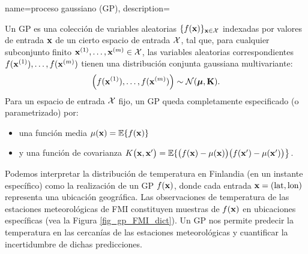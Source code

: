 {name={proceso gaussiano (GP)},
  description={Un GP es una colección de variables aleatorias
  	$\{f({\bf x})\}_{{\bf x} \in \mathcal{X}}$ indexadas por valores de entrada ${\bf x}$ 
  	de un cierto espacio de entrada $\mathcal{X}$, tal que, para cualquier subconjunto finito 
  	${\bf x}^{(1)}, \ldots, {\bf x}^{(m)} \in \mathcal{X}$, 
  	las variables aleatorias correspondientes $f({\bf x}^{(1)}), \ldots, f({\bf x}^{(m)})$ 
  	tienen una distribución conjunta gaussiana multivariante:
  	\[
  	\left( f({\bf x}^{(1)}), \ldots, f({\bf x}^{(m)}) \right) \sim \mathcal{N}(\boldsymbol{\mu}, \mathbf{K}).
  	\]
  	Para un espacio de entrada $\mathcal{X}$ fijo, un GP queda completamente especificado (o parametrizado) por:
  	\begin{itemize}
  		\item una función media $\mu({\bf x}) = \mathbb{E}\{ f({\bf x})\}$
  		\item y una función de covarianza $K\big({\bf x},{\bf x}'\big) = \mathbb{E}\{ \big(f({\bf x})-\mu({\bf x})\big) \big(f({\bf x}')-\mu({\bf x}')\big) \big\}$.
  	\end{itemize}
  	 Podemos interpretar la distribución de temperatura en Finlandia (en un instante específico)
  	como la realización de un GP $f({\bf x})$, donde cada entrada 
  	${\bf x} = (\text{lat}, \text{lon})$ representa una ubicación geográfica. 
  	Las observaciones de temperatura de las estaciones meteorológicas de FMI constituyen 
  	muestras de $f({\bf x})$ en ubicaciones específicas (vea la Figura \ref{fig_gp_FMI_dict}). 
  	Un GP nos permite predecir la temperatura en las cercanías de las estaciones meteorológicas 
  	y cuantificar la incertidumbre de dichas predicciones.
  	\begin{figure}[H]
  	\begin{center}
\end{center}
\end{figure}}}
